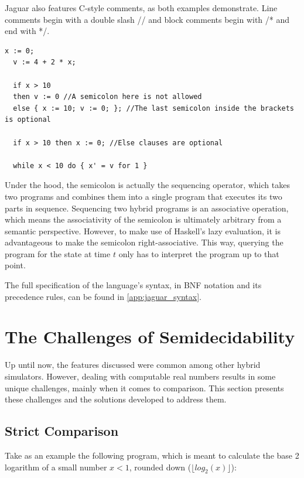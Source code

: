 Jaguar also features C-style comments, as both examples demonstrate. Line comments begin with a double slash // and block comments begin with /* and end with */.

\begin{lstlisting}[caption=Jaguar program with no particular meaning showcasing control structures and subprograms]
  x := 0;
  v := 4 + 2 * x;

  if x > 10
  then v := 0 //A semicolon here is not allowed
  else { x := 10; v := 0; }; //The last semicolon inside the brackets is optional 

  if x > 10 then x := 0; //Else clauses are optional

  while x < 10 do { x' = v for 1 }
\end{lstlisting}

Under the hood, the semicolon is actually the sequencing operator, which takes two programs and combines them into a single program that executes its two parts in sequence. Sequencing two hybrid programs is an associative operation, which means the associativity of the semicolon is ultimately arbitrary from a semantic perspective. However, to make use of Haskell's lazy evaluation, it is advantageous to make the semicolon right-associative. This way, querying the program for the state at time $t$ only has to interpret the program up to that point.

The full specification of the language's syntax, in BNF notation and its precedence rules, can be found in \cref{app:jaguar_syntax}.



\section{The Challenges of Semidecidability}
\label{sec:semidecidability}

Up until now, the features discussed were common among other hybrid simulators. However, dealing with computable real numbers results in some unique challenges, mainly when it comes to comparison. This section presents these challenges and the solutions developed to address them.


\subsection{Strict Comparison}
\label{sec:strict_comparison}

Take as an example the following program, which is meant to calculate the base 2 logarithm of a small number $x < 1$, rounded down ($\lfloor log_2(x) \rfloor$):

